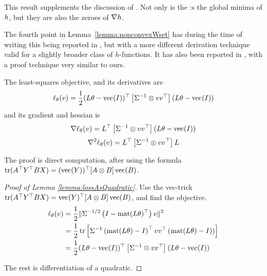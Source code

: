 This result supplements the discussion of \citet[p.7]{zheng_dags_2018}. Not only is the \DAG{}:s the global minima of $h$, but they are also the zeroes of $\nabla h$.

The fourth point in Lemma~\ref{lemma:nonconvexWset} has during the time of writing this being reported in \citet[lemma 4]{wei_dags_2020}, but with a more different derivation technique valid for a slightly broader class of $h$-functions. It has also been reported in \citet[proposition 1]{ng_graph_2019}, with a proof technique very similar to ours.

\begin{lemma}
\label{lemma:lossAsQuadratic}
The least-squares objective, and its derivatives are
\begin{align}
\ell_\theta(v) = \frac{1}{2} (L\theta- \operatorname*{vec}(I))^\top \left[\Sigma^{-1} \otimes vv^\top\right] (L\theta- \operatorname*{vec}(I))
\end{align} 
and its gradient and hessian is
\begin{equation} \label{eq:mest:gradient} \nabla \ell_\theta(v) =  L^\top \left[\Sigma^{-1} \otimes vv^\top\right] ( L\theta- \operatorname*{vec}(I) ) \end{equation}
\[ \nabla^2 \ell_\theta(v) =  L^\top \left[\Sigma^{-1} \otimes vv^\top\right]  L \]
\end{lemma}
The proof is direct computation, after using the formula $\operatorname*{tr}(A^{\top} Y^{\top} BX) = (\operatorname*{vec}(Y))^{\top}[A\otimes B] \operatorname*{vec}(B)$.
\begin{proof}[Proof of Lemma \ref{lemma:lossAsQuadratic}]

Use the vec-trick $\operatorname*{tr}(A^{\top} Y^{\top} BX) = \operatorname*{vec}(Y)^{\top}[A\otimes B] \operatorname*{vec}(B)$, and find the objective.
\begin{align}
    \ell_\theta(v) &= \frac{1}{2}  \lVert\Sigma^{-1/2}\left(I-\operatorname*{mat}(L\theta)^\top\right)v\rVert^2 \\
    &= \frac{1}{2} \operatorname*{tr} \left[ \Sigma^{-1}\left(\operatorname*{mat}(L\theta)-I\right)^{\top}vv^\top \left(\operatorname*{mat}(L\theta)-I)\right) \right] \\
    &= \frac{1}{2} (L\theta- \operatorname*{vec}(I))^\top \left[\Sigma^{-1} \otimes vv^\top\right] (L\theta- \operatorname*{vec}(I))
\end{align} 

The rest is differentiation of a quadratic.
\end{proof}

